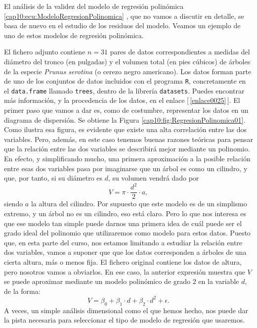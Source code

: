 El análisis de la validez del modelo de regresión polinómica \ref{cap10:ecu:ModeloRegresionPolinomica} , que no vamos a discutir en detalle, se basa de nuevo en el estudio de los residuos del modelo.
Veamos un ejemplo de uno de estos modelos de regresión polinómica.
\begin{ejemplo}
\label{cap10:ejem:RegresionPolinomica}
El fichero adjunto  contiene $n=31$ pares de datos correspondientes a medidas del diámetro del tronco (en pulgadas) y el volumen total (en pies cúbicos) de árboles de la especie {\em Prunus serotina} (o cerezo negro americano). Los datos forman parte de uno de los conjuntos de datos incluidos con el programa {\tt R}, concretamente en el {\tt data.frame} llamado {\tt trees}, dentro de la librería {\tt datasets}. Puedes encontrar más información, y la procedencia de los datos, en el enlace [\,\ref{enlace0025}\,]\label{enlace0025a}.
El primer paso que vamos a dar es, como de costumbre, representar los datos en un diagrama de dispersión. Se obtiene la Figura \ref{cap10:fig:RegresionPolinomica01}. Como ilustra esa figura, es evidente que existe una alta correlación entre las dos variables. Pero, además, en este caso tenemos buenas razones teóricas para pensar que la relación entre las dos variables se describirá mejor mediante un polinomio. En efecto, y simplificando mucho, una primera aproximación a la posible relación entre esas dos variables pasa por imaginarse que un árbol es como un cilindro, y que, por tanto, si su diámetro es $d$, su volumen vendrá dado por
\[V=\pi\cdot \dfrac{d^2}{2}\cdot a,\]
siendo $a$ la altura del cilindro. Por supuesto que este modelo es de un simplismo extremo, y un árbol no es un cilindro, eso está claro. Pero lo que nos interesa es que ese modelo tan simple puede darnos una primera idea de cuál puede ser el grado ideal del polinomio que utilizaremos como modelo para estos datos. Puesto que, en esta parte del curso, nos estamos limitando a estudiar la relación entre dos variables, vamos a suponer que que los datos corresponden a árboles de una cierta altura, más o menos fija. El fichero original contiene los datos de altura, pero nosotros vamos a obviarlos. En ese caso, la anterior expresión muestra que $V$ se puede aproximar mediante un modelo polinómico de grado $2$ en la variable $d$, de la forma:
\[V=\beta_0+\beta_1\cdot d+\beta_2\cdot d^2+\epsilon.\]
A veces, un simple análisis dimensional como el que hemos hecho, nos puede dar la pista necesaria para seleccionar el tipo de modelo de regresión que usaremos.


\end{ejemplo}
